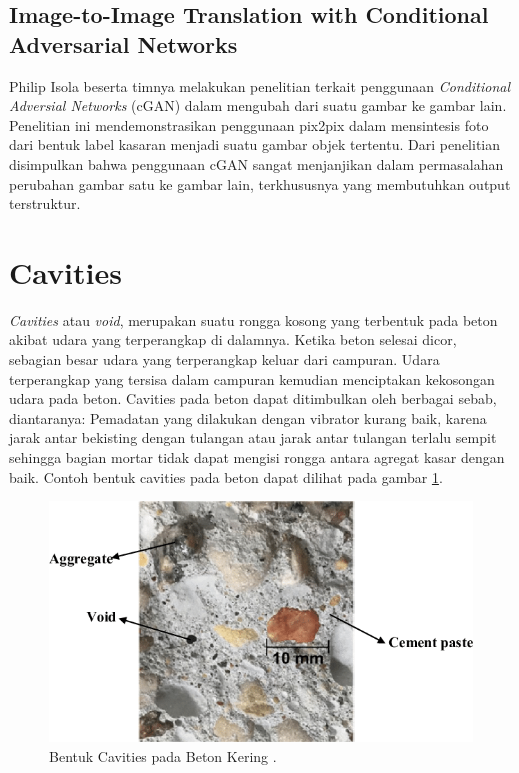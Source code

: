\subsection{Image-to-Image Translation with Conditional Adversarial Networks}
\label{image2imagetranslationCGAN}
Philip Isola beserta timnya melakukan penelitian terkait penggunaan \emph{Conditional Adversial Networks} (cGAN) dalam mengubah dari suatu gambar ke gambar lain. 
Penelitian ini mendemonstrasikan penggunaan pix2pix dalam mensintesis foto dari bentuk label kasaran menjadi suatu gambar objek tertentu. 
Dari penelitian disimpulkan bahwa penggunaan cGAN sangat menjanjikan dalam permasalahan perubahan gambar satu ke gambar lain, terkhususnya yang membutuhkan output terstruktur. \parencite{image2imageCGAN}

\section{Cavities}
\label{sec:cavities}

\emph{Cavities} atau \emph{void}, merupakan suatu rongga kosong yang terbentuk pada beton akibat udara yang terperangkap di dalamnya. 
Ketika beton selesai dicor, sebagian besar udara yang terperangkap keluar dari campuran. 
Udara terperangkap yang tersisa dalam campuran kemudian menciptakan kekosongan udara pada beton. 
Cavities pada beton dapat ditimbulkan oleh berbagai sebab, diantaranya: Pemadatan yang dilakukan dengan vibrator kurang baik, 
karena jarak antar bekisting dengan tulangan atau jarak antar tulangan terlalu sempit sehingga bagian mortar tidak dapat mengisi rongga antara agregat kasar dengan baik. \parencite{analisakerusakanbeton}
Contoh bentuk cavities pada beton dapat dilihat pada gambar \ref{fig:voidOnConcrete}.

\begin{figure}[ht]
  \centering
  \includegraphics[scale=0.5]{gambar/voidOnConcrete.png}
  \caption{Bentuk Cavities pada Beton Kering \parencite{voidOnConcrete}.}
  \label{fig:voidOnConcrete}
\end{figure}

